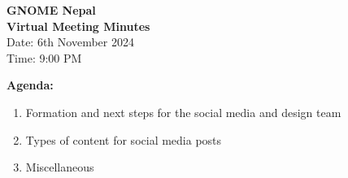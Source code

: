 \documentclass[a4paper,12pt]{article}
\begin{document}
\begin{center}
    \textbf{\Large GNOME Nepal} \\[0.2cm]
    \textbf{Virtual Meeting Minutes} \\[0.2cm]
    Date: 6th November 2024 \\
    Time: 9:00 PM \\
\end{center}

\vspace{0.5cm}

\noindent\textbf{Agenda:}
\begin{enumerate}[label=\arabic*.]
    \item Formation and next steps for the social media and design team
    \item Types of content for social media posts
    \item Miscellaneous
\end{enumerate}

\vspace{0.5cm}
\end{document}
